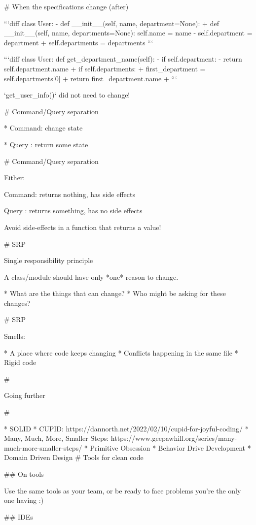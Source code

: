 # When the specifications change (after)


```diff
class User:
- def __init__(self, name, department=None):
+ def __init__(self, name, departments=None):
        self.name = name
-        self.department = department
+        self.departments = departments
```

```diff
class User:
   def get_department_name(self):
-       if self.department:
-           return self.department.name
+       if self.departments:
+           first_department = self.departments[0]
+           return first_department.name
+
```

`get_user_info()` did not need to change!

# Command/Query separation

* Command: change state

* Query : return some state

# Command/Query separation

Either:

Command: returns nothing, has side effects

Query : returns something, has no side effects

\vfill

Avoid side-effects in a function that returns a value!

# SRP

Single responsibility principle

A class/module should have only *one* reason to change.

* What are the things that can change?
* Who might be asking for these changes?

# SRP

Smells:

* A place where code keeps changing
* Conflicts happening in the same file
* Rigid code

#

\huge \center Going further

#

* SOLID
* CUPID: https://dannorth.net/2022/02/10/cupid-for-joyful-coding/
* Many, Much, More, Smaller Steps: https://www.geepawhill.org/series/many-much-more-smaller-steps/
* Primitive Obsession
* Behavior Drive Development
* Domain Driven Design
# Tools for clean code

## On tools

Use the same tools as your team, or be ready to face
problems you're the only one having :)

## IDEs

